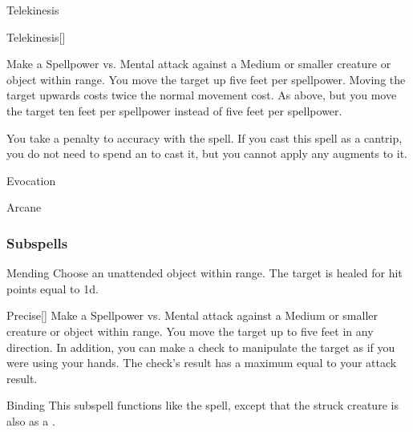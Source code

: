 \newpage
\begin{spellsection}{Telekinesis}


\begin{ability}{Telekinesis}[]

Make a Spellpower vs. Mental attack against a Medium or smaller creature or object within \rngclose range.
\hit You move the target up five feet per spellpower. Moving the target upwards costs twice the normal movement cost.
\crit As above, but you move the target ten feet per spellpower instead of five feet per spellpower.

\end{ability}



 You take a  penalty to accuracy with the spell. If you cast this spell as a cantrip,
you do not need to spend an  to cast it,
but you cannot apply any augments to it.


 Evocation

 Arcane
\end{spellsection}


\subsubsection{Subspells}


\begin{ability}[\nth{2}]{Mending}
Choose an unattended object within \rngclose range.
The target is healed for hit points equal to  \plus1d.
\end{ability}
\vspace{0.25em}


\begin{ability}[\nth{2}]{Precise}[]
Make a Spellpower vs. Mental attack against a Medium or smaller creature or object within \rngclose range.
\hit You move the target up to five feet in any direction.
In addition, you can make a check to manipulate the target as if you were using your hands.
The check's result has a maximum equal to your attack result.
\end{ability}
\vspace{0.25em}


\begin{ability}[\nth{3}]{Binding}
This subspell functions like the  spell, except that the struck creature is also \immobilized as a .
\end{ability}
\vspace{0.25em}


